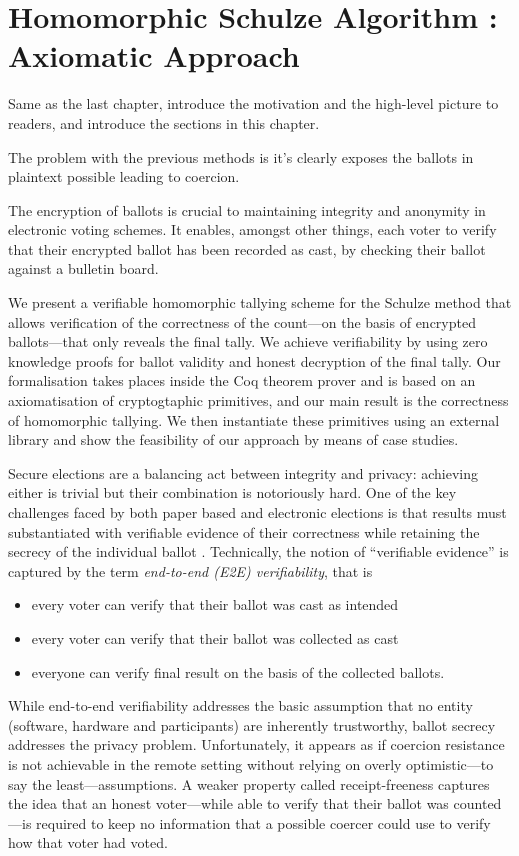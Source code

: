 \chapter{Homomorphic Schulze Algorithm : Axiomatic Approach}
\label{cha:homormorphic_schulze}
Same as the last chapter, introduce the motivation and the high-level picture to
readers, and introduce the sections in this chapter. 

The problem with the previous methods is it's clearly exposes the ballots 
in plaintext possible leading to coercion. 

The encryption of ballots is crucial to maintaining integrity and 
anonymity in electronic voting schemes. It enables, amongst other 
things, each voter to verify that their encrypted ballot has been 
recorded as cast, by checking their ballot against a bulletin board. 

We present a verifiable homomorphic tallying scheme for the Schulze 
method that allows verification of the correctness of the count---on the 
basis of encrypted ballots---that only reveals the final tally. We 
achieve verifiability by using zero knowledge proofs for ballot 
validity and honest decryption of the final tally. Our formalisation 
takes places inside the Coq theorem prover and is based on an 
axiomatisation of cryptogtaphic primitives, and our main result is 
the correctness of homomorphic tallying. We then instantiate 
these primitives using an external library and show the feasibility 
of our approach by means of case studies.

Secure elections are a balancing act between integrity and privacy:
achieving either is trivial but their combination is notoriously hard.
One of the key challenges faced by both paper based and electronic
elections is that results must substantiated with
verifiable evidence of their correctness while retaining the secrecy
of the individual ballot \cite{Bernhard:2017:PES}.  Technically, the
notion of ``verifiable evidence'' is captured by the term 
\emph{end-to-end (E2E) verifiability}, that is
\begin{itemize}
  \item every voter can verify that their ballot was cast as
  intended
  \item every voter can verify that their ballot was collected as
  cast
  \item everyone can verify final result on the basis of the
  collected ballots.
\end{itemize}
While end-to-end verifiability addresses the basic assumption that
no entity (software, hardware and participants) are inherently
trustworthy, ballot secrecy addresses the privacy problem.
Unfortunately, it appears as if coercion resistance is not achievable  
in the remote setting without relying on overly optimistic---to say the least---assumptions.
A weaker property called receipt-freeness captures the idea that an honest 
voter---while able to verify that their ballot was counted---is required to keep 
no information that a possible coercer could use to verify how that voter had voted.

